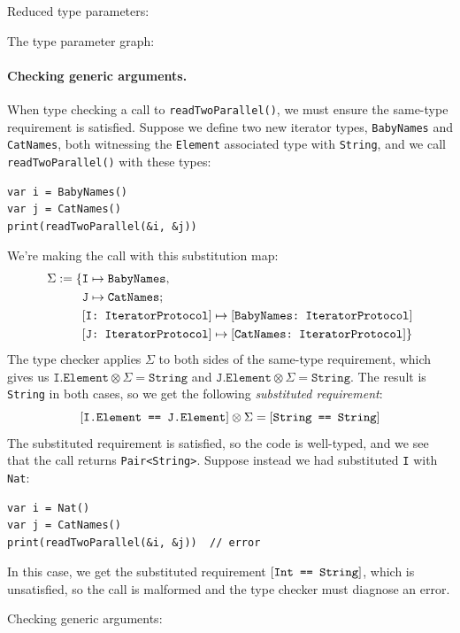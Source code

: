 \documentclass[../generics]{subfiles}
\begin{document}
\begin{MoreDetails}
\item Reduced type parameters: 
\item The type parameter graph: 
\end{MoreDetails}

\paragraph{Checking generic arguments.}
When type checking a call to \verb|readTwoParallel()|, we must ensure the same-type requirement is satisfied. Suppose we define two new iterator types, \texttt{BabyNames} and \texttt{CatNames}, both witnessing the \texttt{Element} associated type with \texttt{String}, and we call \verb|readTwoParallel()| with these types:
\begin{Verbatim}
var i = BabyNames()
var j = CatNames()
print(readTwoParallel(&i, &j))
\end{Verbatim}
We're making the call with this substitution map:
\begin{align*}
\Sigma := \{&\texttt{I} \mapsto \texttt{BabyNames},\\
&\texttt{J} \mapsto \texttt{CatNames};\,\\
&[\texttt{I:~IteratorProtocol}] \mapsto [\texttt{BabyNames:~IteratorProtocol}]\\
&[\texttt{J:~IteratorProtocol}] \mapsto [\texttt{CatNames:~IteratorProtocol}]\}
\end{align*}
The type checker applies $\Sigma$ to both sides of the same-type requirement, which gives us $\texttt{I.Element}\otimes\Sigma=\texttt{String}$ and $\texttt{J.Element}\otimes\Sigma=\texttt{String}$. The result is \texttt{String} in both cases, so we get the following \emph{substituted requirement}:
\[[\texttt{I.Element == J.Element}]\otimes\Sigma=[\texttt{String == String}]\]
The substituted requirement is satisfied, so the code is well-typed, and we see that the call returns \texttt{Pair<String>}. Suppose instead we had substituted \texttt{I} with \texttt{Nat}:
\begin{Verbatim}
var i = Nat()
var j = CatNames()
print(readTwoParallel(&i, &j))  // error
\end{Verbatim}
In this case, we get the substituted requirement $[\texttt{Int == String}]$, which is unsatisfied, so the call is malformed and the type checker must diagnose an error.

\begin{MoreDetails}
\item Checking generic arguments: 
\end{MoreDetails}
\end{document}
